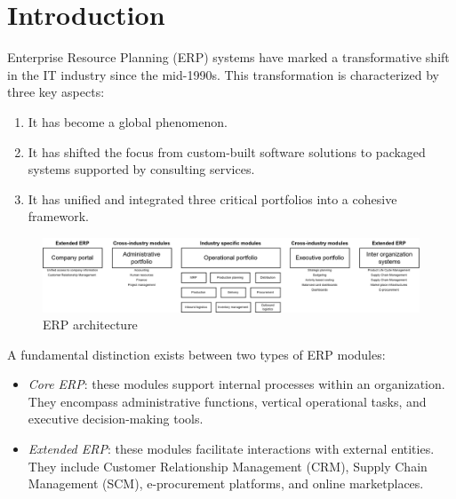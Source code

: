 \section{Introduction}

Enterprise Resource Planning (ERP) systems have marked a transformative shift in the IT industry since the mid-1990s. 
This transformation is characterized by three key aspects: 
\begin{enumerate}
    \item It has become a global phenomenon.
    \item It has shifted the focus from custom-built software solutions to packaged systems supported by consulting services.
    \item It has unified and integrated three critical portfolios into a cohesive framework.
\end{enumerate}
\begin{figure}[H]
    \centering
    \includegraphics[width=1\linewidth]{images/bis1.png}
    \caption{ERP architecture}
\end{figure}
\noindent A fundamental distinction exists between two types of ERP modules:
\begin{itemize}
    \item \textit{Core ERP}: these modules support internal processes within an organization. 
        They encompass administrative functions, vertical operational tasks, and executive decision-making tools.
    \item \textit{Extended ERP}: these modules facilitate interactions with external entities.
        They include Customer Relationship Management (CRM), Supply Chain Management (SCM), e-procurement platforms, and online marketplaces.
\end{itemize}

